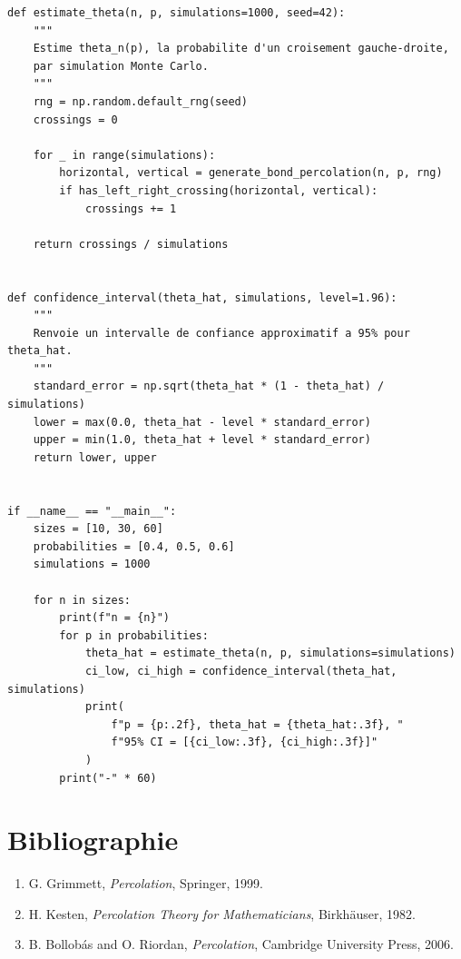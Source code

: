 \documentclass[11pt,a4paper]{report}
\begin{document}
\begin{lstlisting}[caption={Simulation de la percolation par aretes en Python},label={lst:percolation-python}]
def estimate_theta(n, p, simulations=1000, seed=42):
    """
    Estime theta_n(p), la probabilite d'un croisement gauche-droite,
    par simulation Monte Carlo.
    """
    rng = np.random.default_rng(seed)
    crossings = 0

    for _ in range(simulations):
        horizontal, vertical = generate_bond_percolation(n, p, rng)
        if has_left_right_crossing(horizontal, vertical):
            crossings += 1

    return crossings / simulations


def confidence_interval(theta_hat, simulations, level=1.96):
    """
    Renvoie un intervalle de confiance approximatif a 95% pour theta_hat.
    """
    standard_error = np.sqrt(theta_hat * (1 - theta_hat) / simulations)
    lower = max(0.0, theta_hat - level * standard_error)
    upper = min(1.0, theta_hat + level * standard_error)
    return lower, upper


if __name__ == "__main__":
    sizes = [10, 30, 60]
    probabilities = [0.4, 0.5, 0.6]
    simulations = 1000

    for n in sizes:
        print(f"n = {n}")
        for p in probabilities:
            theta_hat = estimate_theta(n, p, simulations=simulations)
            ci_low, ci_high = confidence_interval(theta_hat, simulations)
            print(
                f"p = {p:.2f}, theta_hat = {theta_hat:.3f}, "
                f"95% CI = [{ci_low:.3f}, {ci_high:.3f}]"
            )
        print("-" * 60)
\end{lstlisting}

\chapter*{Bibliographie}

\begin{enumerate}
    \item G. Grimmett, \textit{Percolation}, Springer, 1999.
    \item H. Kesten, \textit{Percolation Theory for Mathematicians}, Birkhäuser, 1982.
    \item B. Bollobás and O. Riordan, \textit{Percolation}, Cambridge University Press, 2006.
\end{enumerate}
\end{document}
